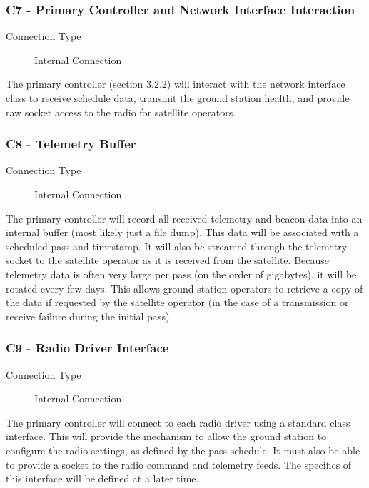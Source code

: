 \documentclass{mxl-note}
\begin{document}
\subsubsection{C7 - Primary Controller and Network Interface Interaction}
\begin{description}
	\item [Connection Type] Internal Connection
\end{description}
The primary controller (section 3.2.2) will interact with the network interface class to receive schedule data, transmit the ground station health, and provide raw socket access to the radio for satellite operators.

\subsubsection{C8 - Telemetry Buffer}
\begin{description}
	\item [Connection Type] Internal Connection
\end{description}
The primary controller will record all received telemetry and beacon data into an internal buffer (most likely just a file dump). This data will be associated with a scheduled pass and timestamp. It will also be streamed through the telemetry socket to the satellite operator as it is received from the satellite. Because telemetry data is often very large per pass (on the order of gigabytes), it will be rotated every few days. This allows ground station operators to retrieve a copy of the data if requested by the satellite operator (in the case of a transmission or receive failure during the initial pass). 

\subsubsection{C9 - Radio Driver Interface}
\begin{description}
	\item [Connection Type] Internal Connection
\end{description}
The primary controller will connect to each radio driver using a standard class interface. This will provide the mechanism to allow the ground station to configure the radio settings, as defined by the pass schedule. It must also be able to provide a socket to the radio command and telemetry feeds. The specifics of this interface will be defined at a later time.
\end{document}

